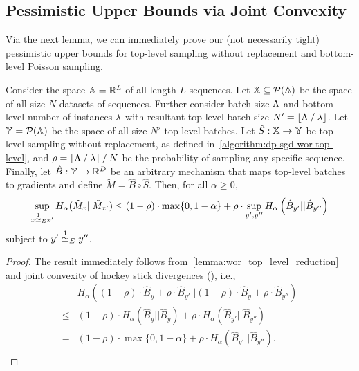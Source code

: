 \subsection{Pessimistic Upper Bounds via Joint Convexity}
Via the next lemma, we can immediately prove our (not necessarily tight) pessimistic upper bounds for top-level sampling without replacement
and bottom-level Poisson sampling.
\begin{lemma}\label{lemma:wor_top_level_reduction_joint_convexity}
    Consider the space ${\mathbb{A}} = {\mathbb{R}}^L$ of all length-$L$ sequences.
    Let ${\mathbb{X}} \subseteq \mathcal{P}({\mathbb{A}})$ be the space of all size-$N$ datasets of sequences.
    Further consider batch size $\Lambda$ and bottom-level number of instances $\lambda$
    with resultant top-level batch size $N' = \lfloor \Lambda \mathbin{/} \lambda \rfloor$.
    Let ${\mathbb{Y}} = \mathcal{P}({\mathbb{A}})$ be the space of all size-$N'$ top-level batches.
    Let $\hat{S} : {\mathbb{X}} \rightarrow {\mathbb{Y}}$ be top-level sampling without replacement, as defined in~\cref{algorithm:dp-sgd-wor-top-level},
    and $\rho = \lfloor \Lambda \mathbin{/} \lambda \rfloor \mathbin{/} N$ be the probability of sampling any specific sequence.
    Finally, let $\hat{B} : {\mathbb{Y}} \rightarrow {\mathbb{R}}^D$ be an arbitrary mechanism that maps top-level batches to gradients
    and define $\tilde{M} = \hat{B} \circ \hat{S}$.
    Then, for all $\alpha \geq 0$,
    \begin{equation*}
         \sup_{x \overset{1}{\simeq}_{E} x'} H_\alpha(\tilde{M}_x || \tilde{M}_{x'})
         \leq 
        (1 - \rho) \cdot 
        \max \{0, 1 - \alpha \}
        +
        \rho \cdot
        \sup_{y', y'' }
        H_\alpha\left(\hat{B}_{y'}
            ||
            \hat{B}_{y''}\right)
    \end{equation*}
    subject to $y' \overset{1}{\simeq}_{E} y''$.
\end{lemma}
\begin{proof}
    The result immediately follows from~\cref{lemma:wor_top_level_reduction} and joint convexity of hockey stick divergences (\cite{balle2020privacy}), i.e.,
    \begin{align*}
        &
        H_\alpha\left((1 - \rho) \cdot \hat{B}_{y} + \rho \cdot \hat{B}_{y'}
            ||
            (1 - \rho) \cdot \hat{B}_{y} + \rho \cdot \hat{B}_{y''}\right) \\
        \leq
        &
        (1 - \rho)  \cdot H_\alpha(\hat{B}_{y} || \hat{B}_{y})
        +
        \rho
        \cdot
        H_\alpha\left(\hat{B}_{y'}
            ||
            \hat{B}_{y''}\right) \\
        =
        &
        (1 - \rho) \cdot 
        \max \{0, 1-\alpha\}
        +
        \rho
        \cdot
        H_\alpha\left(\hat{B}_{y'}
            ||
            \hat{B}_{y''}\right). \\
    \end{align*}
\end{proof}
